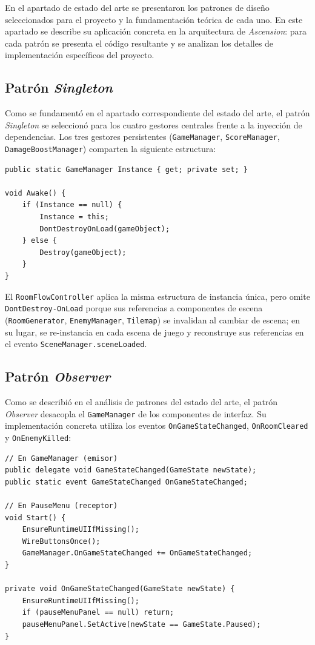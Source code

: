 En el apartado de estado del arte se presentaron los patrones de diseño seleccionados para el proyecto y la fundamentación teórica de cada uno. En este apartado se describe su aplicación concreta en la arquitectura de \textit{Ascension}: para cada patrón se presenta el código resultante y se analizan los detalles de implementación específicos del proyecto.

\subsection{Patrón \textit{Singleton}}


Como se fundamentó en el apartado correspondiente del estado del arte, el patrón \textit{Singleton} se seleccionó para los cuatro gestores centrales frente a la inyección de dependencias. Los tres gestores persistentes (\texttt{GameManager}, \texttt{ScoreManager}, \texttt{DamageBoostManager}) comparten la siguiente estructura:

\begin{lstlisting}
public static GameManager Instance { get; private set; }

void Awake() {
    if (Instance == null) {
        Instance = this;
        DontDestroyOnLoad(gameObject);
    } else {
        Destroy(gameObject);
    }
}
\end{lstlisting}


El \texttt{RoomFlowController} aplica la misma estructura de instancia única, pero omite \texttt{DontDestroy-}\texttt{OnLoad} porque sus referencias a componentes de escena (\texttt{RoomGenerator}, \texttt{EnemyManager}, \texttt{Tilemap}) se invalidan al cambiar de escena; en su lugar, se re-instancia en cada escena de juego y reconstruye sus referencias en el evento \texttt{SceneManager.sceneLoaded}.

\subsection{Patrón \textit{Observer}}


Como se describió en el análisis de patrones del estado del arte, el patrón \textit{Observer} desacopla el \texttt{GameManager} de los componentes de interfaz. Su implementación concreta utiliza los eventos \texttt{OnGameStateChanged}, \texttt{OnRoomCleared} y \texttt{OnEnemyKilled}:

\begin{lstlisting}
// En GameManager (emisor)
public delegate void GameStateChanged(GameState newState);
public static event GameStateChanged OnGameStateChanged;

// En PauseMenu (receptor)
void Start() {
    EnsureRuntimeUIIfMissing();
    WireButtonsOnce();
    GameManager.OnGameStateChanged += OnGameStateChanged;
}

private void OnGameStateChanged(GameState newState) {
    EnsureRuntimeUIIfMissing();
    if (pauseMenuPanel == null) return;
    pauseMenuPanel.SetActive(newState == GameState.Paused);
}
\end{lstlisting}



